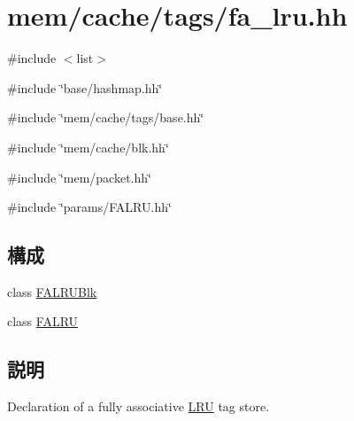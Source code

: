 \hypertarget{fa__lru_8hh}{
\section{mem/cache/tags/fa\_\-lru.hh}
\label{fa__lru_8hh}
}
{\ttfamily \#include $<$list$>$}\par
{\ttfamily \#include \char`\"{}base/hashmap.hh\char`\"{}}\par
{\ttfamily \#include \char`\"{}mem/cache/tags/base.hh\char`\"{}}\par
{\ttfamily \#include \char`\"{}mem/cache/blk.hh\char`\"{}}\par
{\ttfamily \#include \char`\"{}mem/packet.hh\char`\"{}}\par
{\ttfamily \#include \char`\"{}params/FALRU.hh\char`\"{}}\par
\subsection*{構成}
\begin{DoxyCompactItemize}
\item 
class \hyperlink{classFALRUBlk}{FALRUBlk}
\item 
class \hyperlink{classFALRU}{FALRU}
\end{DoxyCompactItemize}


\subsection{説明}
Declaration of a fully associative \hyperlink{classLRU}{LRU} tag store. 